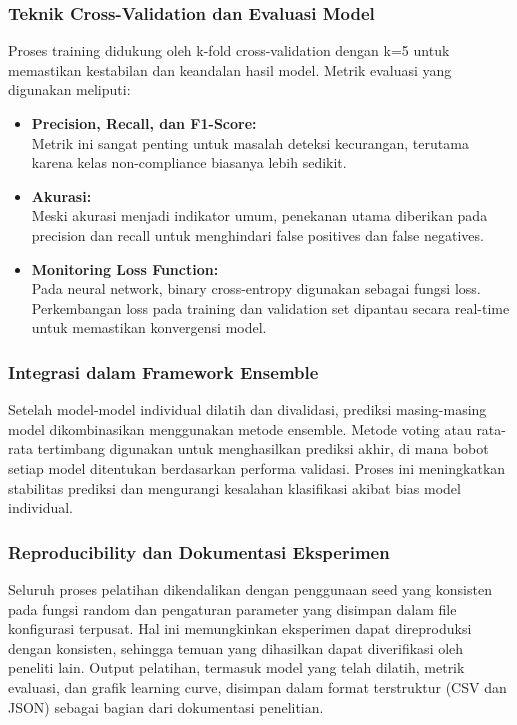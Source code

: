 \subsubsection{Teknik Cross-Validation dan Evaluasi Model}
Proses training didukung oleh k-fold cross-validation dengan k=5 untuk memastikan kestabilan dan keandalan hasil model. Metrik evaluasi yang digunakan meliputi:
\begin{itemize}
    \item \textbf{Precision, Recall, dan F1-Score:}\\
    Metrik ini sangat penting untuk masalah deteksi kecurangan, terutama karena kelas non-compliance biasanya lebih sedikit.
    
    \item \textbf{Akurasi:}\\
    Meski akurasi menjadi indikator umum, penekanan utama diberikan pada precision dan recall untuk menghindari false positives dan false negatives.
    
    \item \textbf{Monitoring Loss Function:}\\
    Pada neural network, binary cross-entropy digunakan sebagai fungsi loss. Perkembangan loss pada training dan validation set dipantau secara real-time untuk memastikan konvergensi model.
\end{itemize}

\subsubsection{Integrasi dalam Framework Ensemble}
Setelah model-model individual dilatih dan divalidasi, prediksi masing-masing model dikombinasikan menggunakan metode ensemble. Metode voting atau rata-rata tertimbang digunakan untuk menghasilkan prediksi akhir, di mana bobot setiap model ditentukan berdasarkan performa validasi. Proses ini meningkatkan stabilitas prediksi dan mengurangi kesalahan klasifikasi akibat bias model individual.

\subsubsection{Reproducibility dan Dokumentasi Eksperimen}
Seluruh proses pelatihan dikendalikan dengan penggunaan seed yang konsisten pada fungsi random dan pengaturan parameter yang disimpan dalam file konfigurasi terpusat. Hal ini memungkinkan eksperimen dapat direproduksi dengan konsisten, sehingga temuan yang dihasilkan dapat diverifikasi oleh peneliti lain. Output pelatihan, termasuk model yang telah dilatih, metrik evaluasi, dan grafik learning curve, disimpan dalam format terstruktur (CSV dan JSON) sebagai bagian dari dokumentasi penelitian.

